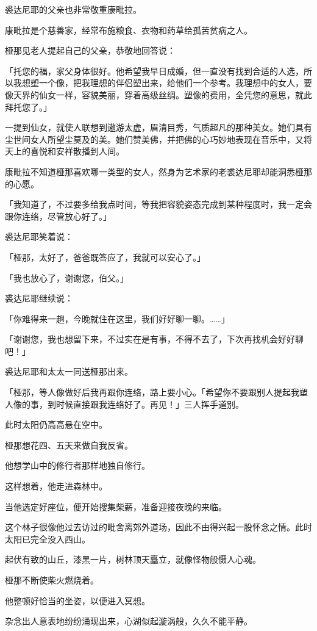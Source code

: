 \documentclass[twoside,openany]{book}
\begin{document}
裘达尼耶的父亲也非常敬重康毗拉。

康毗拉是个慈善家，经常布施粮食、衣物和药草给孤苦贫病之人。

桠那见老人提起自己的父亲，恭敬地回答说：

「托您的福，家父身体很好。他希望我早日成婚，但一直没有找到合适的人选，所以我想塑一个像，把我理想的伴侣塑出来，给他们一个参考。我理想中的女人，要像天界的仙女一样，容貌美丽，穿着高级丝绸。塑像的费用，全凭您的意思，就此拜托您了。」

一提到仙女，就使人联想到遨游太虚，眉清目秀，气质超凡的那种美女。她们具有尘世间女人所望尘莫及的美。她们赞美佛，并把佛的心巧妙地表现在音乐中，又将天上的喜悦和安祥散播到人间。

康毗拉不知道桠那喜欢哪一类型的女人，然身为艺术家的老裘达尼耶却能洞悉桠那的心愿。

「我知道了，不过要多给我点时间，等我把容貌姿态完成到某种程度时，我一定会跟你连络，尽管放心好了。」

裘达尼耶笑着说：

「桠那，太好了，爸爸既答应了，我就可以安心了。」

「我也放心了，谢谢您，伯父。」

裘达尼耶继续说：

「你难得来一趟，今晚就住在这里，我们好好聊一聊。……」

「谢谢您，我也想留下来，不过实在是有事，不得不去了，下次再找机会好好聊吧！」

裘达尼耶和太太一同送桠那出来。

「桠那，等人像做好后我再跟你连络，路上要小心。「希望你不要跟别人提起我塑人像的事，到时候直接跟我连络好了。再见！」三人挥手道别。

此时太阳仍高高悬在空中。

桠那想花四、五天来做自我反省。



他想学山中的修行者那样地独自修行。

这样想着，他走进森林中。

当他选定好座位，便开始搜集柴薪，准备迎接夜晚的来临。

这个林子很像他过去访过的毗舍离郊外道场，因此不由得兴起一股怀念之情。此时太阳已完全没入西山。

起伏有致的山丘，漆黑一片，树林顶天矗立，就像怪物般慑人心魂。

桠那不断使柴火燃烧着。

他整顿好恰当的坐姿，以便进入冥想。

杂念出人意表地纷纷涌现出来，心湖似起漩涡般，久久不能平静。
\end{document}
